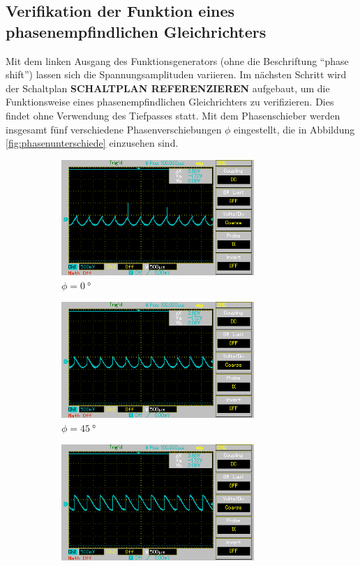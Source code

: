 \subsection[]{Verifikation der Funktion eines phasenempfindlichen Gleichrichters}
Mit dem linken Ausgang des Funktionsgenerators (ohne die Beschriftung \enquote{phase shift}) lassen sich die Spannungsamplituden variieren.
%
Im nächsten Schritt wird der Schaltplan \textbf{SCHALTPLAN REFERENZIEREN} aufgebaut,
um die Funktionsweise eines phasenempfindlichen Gleichrichters zu verifizieren.
Dies findet ohne Verwendung des Tiefpasses statt.
Mit dem Phasenschieber werden insgesamt fünf verschiedene Phasenverschiebungen $\phi$ eingestellt,
die in Abbildung \ref{fig:phasenunterschiede} einzusehen sind.
%
\begin{figure}%
    \begin{subfigure}{0.5\textwidth}%
    \centering%
    \includegraphics[width = 7.3cm]{./Oszilloskop Bilder/png/5.2/1 MAP002.png}%
    \caption{$\phi = \qty[]{0}{\degree}$}%
    \label{fig:phase1}%
    \end{subfigure}%
    \hfill%
    \begin{subfigure}{0.5\textwidth}%
    \centering%
    \includegraphics[width = 7.3cm]{./Oszilloskop Bilder/png/5.2/2 MAP003.png}%
    \caption{$\phi = \qty[]{45}{\degree}$}%
    \label{fig:phase2}%
    \end{subfigure}%
    \hfill
    \begin{subfigure}{0.5\textwidth}%
    \centering%
    \includegraphics[width = 7.3cm]{./Oszilloskop Bilder/png/5.2/3 MAP004.png}%

\end{subfigure}
\end{figure}
